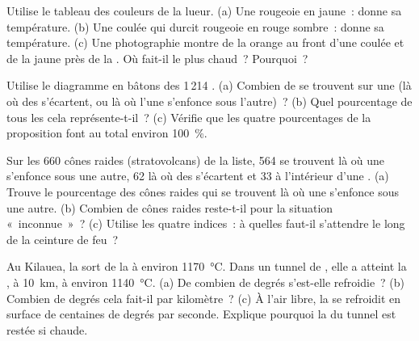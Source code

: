 \begin{exercise}[$\star$]\label{exo:g7:volcanoes:4}
Utilise le tableau des couleurs de la lueur. (a) Une  rougeoie en
jaune~: donne sa température. (b) Une coulée qui durcit rougeoie en rouge
sombre~: donne sa température. (c) Une photographie montre de la 
orange au front d'une coulée et de la  jaune près de la . Où
fait-il le plus chaud~? Pourquoi~?
\end{exercise}

\begin{exercise}[$\star\star$]\label{exo:g7:volcanoes:5}
Utilise le diagramme en bâtons des 1\,214 . (a) Combien de 
se trouvent sur une  (là où des  s'écartent, ou là
où l'une s'enfonce sous l'autre)~? (b) Quel pourcentage de tous les 
cela représente-t-il~? (c) Vérifie que les quatre pourcentages de la
proposition font au total environ 100~\%.
\end{exercise}

\begin{exercise}[$\star\star$]\label{exo:g7:volcanoes:6}
Sur les 660 cônes raides (stratovolcans) de la liste, 564 se trouvent là où
une  s'enfonce sous une autre, 62 là où des  s'écartent et 33
à l'intérieur d'une . (a) Trouve le pourcentage des cônes raides qui
se trouvent là où une  s'enfonce sous une autre. (b) Combien de
cônes raides reste-t-il pour la situation «~inconnue~»~? (c) Utilise les
quatre indices~: à quelles  faut-il s'attendre le long de la
ceinture de feu~?
\end{exercise}

\begin{exercise}[$\star\star$]\label{exo:g7:volcanoes:7}
Au Kilauea, la  sort de la  à environ \qty{1170}{\degreeCelsius}.
Dans un tunnel de , elle a atteint la , à \qty{10}{km}, à environ
\qty{1140}{\degreeCelsius}. (a) De combien de degrés s'est-elle
refroidie~? (b) Combien de degrés cela fait-il par kilomètre~? (c) À l'air
libre, la  se refroidit en surface de centaines de degrés par seconde.
Explique pourquoi la  du tunnel est restée si chaude.
\end{exercise}

